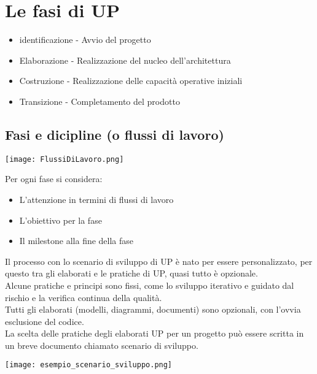  \section{Le fasi di UP}
 \begin{itemize}
    \item identificazione - Avvio del progetto
    \item Elaborazione - Realizzazione del nucleo dell'architettura
    \item Costruzione - Realizzazione delle capacità operative iniziali
    \item Transizione - Completamento del prodotto
 \end{itemize}
\subsection{Fasi e dicipline (o flussi di lavoro)}
\begin{center}
    \texttt{[image: FlussiDiLavoro.png]}
\end{center}
Per ogni fase si considera:
\begin{itemize}
    \item L'attenzione in termini di flussi di lavoro
    \item L'obiettivo per la fase
    \item Il milestone alla fine della fase
\end{itemize}
Il processo con lo scenario di sviluppo di UP è nato per essere personalizzato,
per questo tra gli elaborati e le pratiche di UP, quasi tutto è opzionale.
\\ Alcune pratiche e principi sono fissi, come lo sviluppo iterativo e guidato dal rischio
e la verifica continua della qualità.
\\ Tutti gli elaborati (modelli, diagrammi, documenti) sono opzionali, con l'ovvia
esclusione del codice.
\\ La scelta delle pratiche degli elaborati UP per un progetto può essere scritta in un
breve documento chiamato scenario di sviluppo.
\begin{center}
    \texttt{[image: esempio\_scenario\_sviluppo.png]}
\end{center}

